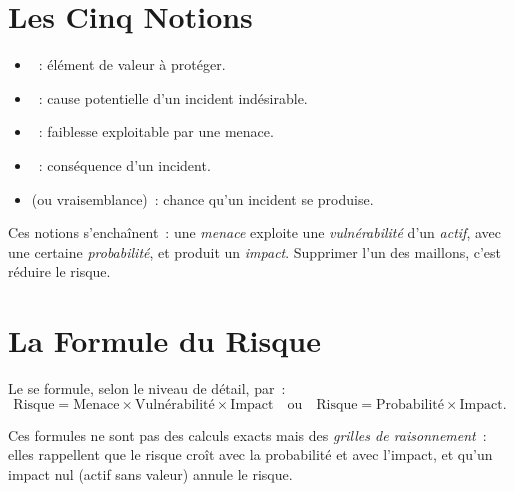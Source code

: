 \separateur

\section{Les Cinq Notions}
\label{sec:c11-notions}

\begin{boxdef}
\begin{itemize}
    \item {}~: élément de valeur à protéger.
    \item {}~: cause potentielle d'un incident indésirable.
    \item {}~: faiblesse exploitable par une menace.
    \item {}~: conséquence d'un incident.
    \item {} (ou vraisemblance)~: chance qu'un incident se
          produise.
\end{itemize}
\end{boxdef}

Ces notions s'enchaînent~: une \emph{menace} exploite une \emph{vulnérabilité}
d'un \emph{actif}, avec une certaine \emph{probabilité}, et produit un
\emph{impact}. Supprimer l'un des maillons, c'est réduire le risque.

\section{La Formule du Risque}
\label{sec:c11-formule}

\begin{boxdef}
Le  se formule, selon le niveau de détail, par~:
\[
\text{Risque} = \text{Menace} \times \text{Vulnérabilité} \times \text{Impact}
\quad\text{ou}\quad
\text{Risque} = \text{Probabilité} \times \text{Impact}.
\]
\end{boxdef}

Ces formules ne sont pas des calculs exacts mais des \emph{grilles de
raisonnement}~: elles rappellent que le risque croît avec la probabilité et
avec l'impact, et qu'un impact nul (actif sans valeur) annule le risque.

